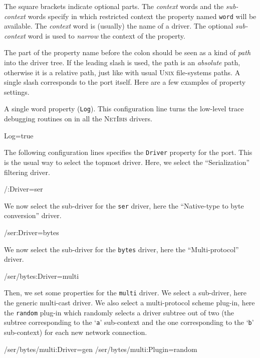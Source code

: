 \documentclass[11pt]{book}
\def\NetIbis{\textsc{NetIbis}\xspace}
\begin{document}
The square brackets indicate optional parts. The \emph{context} words and the
\emph{sub-context}\label{subcontext} words specify in which restricted context the property
named \texttt{word} will be available. The \emph{context} word is
(usually) the name of a driver. The optional \emph{sub-context} word is
used to \emph{narrow} the context of the property.

The part of the property name before the colon should be seen as a
kind of \emph{path} into the driver tree. If the leading slash is
used, the path is an \emph{absolute} path, otherwise it is a relative
path, just like with usual \textsc{Unix} file-systems paths. A single
slash corresponds to the port itself. Here are a few examples of
property settings.

A single word property (\texttt{Log}). This configuration line turns
the low-level trace debugging routines on in all the \NetIbis drivers.
\begin{Miniverb}

  Log=true

\end{Miniverb}

The following configuration lines specifies the \texttt{Driver}
property for the port. This is the usual way to select the topmost
driver. Here, we select the ``Serialization'' filtering driver.
\begin{Miniverb}

  /:Driver=ser

\end{Miniverb}

We now select the sub-driver for the \texttt{ser} driver, here the
``Native-type to byte conversion'' driver.
\begin{Miniverb}

  /ser:Driver=bytes

\end{Miniverb}

We now select the sub-driver for the \texttt{bytes} driver, here the
``Multi-protocol'' driver.
\begin{Miniverb}

  /ser/bytes:Driver=multi

\end{Miniverb}

Then, we set some properties for the \texttt{multi} driver. We select
a sub-driver, here the generic multi-cast driver. We also select a
multi-protocol scheme plug-in, here the \texttt{random} plug-in which
randomly selects a driver subtree out of two (the subtree corresponding
to the `\texttt{a}' sub-context and the one corresponding to the
`\texttt{b}' sub-context) for each new network connection.
\begin{Miniverb}

  /ser/bytes/multi:Driver=gen
  /ser/bytes/multi:Plugin=random

\end{Miniverb}
\end{document}
